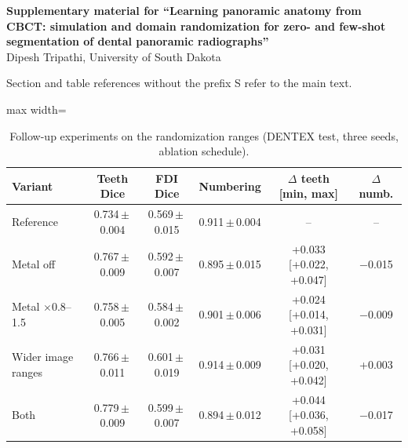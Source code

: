 \documentclass[12pt]{article}
\newcommand{\pmsd}[2]{#1\,$\pm$\,#2}
\begin{document}
\begin{center}
{\large\bfseries Supplementary material for ``Learning panoramic anatomy from CBCT: simulation and domain randomization
for zero- and few-shot segmentation of dental panoramic radiographs''}\\[6pt]
Dipesh Tripathi, University of South Dakota
\end{center}

Section and table references without the prefix S refer to the main text.

\begin{table}[h]
\centering\small
\caption{Follow-up experiments on the randomization ranges (DENTEX test, three seeds, ablation schedule).}
\label{tab:follow}
\begin{adjustbox}{max width=\linewidth}
\begin{tabular}{@{}lccccc@{}}
\toprule
Variant & Teeth Dice & FDI Dice & Numbering & $\Delta$ teeth [min, max] & $\Delta$ numb. \\
\midrule
Reference & \pmsd{0.734}{0.004} & \pmsd{0.569}{0.015} & \pmsd{0.911}{0.004} & -- & -- \\
Metal off & \pmsd{0.767}{0.009} & \pmsd{0.592}{0.007} & \pmsd{0.895}{0.015} & +0.033 [+0.022, +0.047] & $-$0.015 \\
Metal $\times$0.8--1.5 & \pmsd{0.758}{0.005} & \pmsd{0.584}{0.002} & \pmsd{0.901}{0.006} & +0.024 [+0.014, +0.031] & $-$0.009 \\
Wider image ranges & \pmsd{0.766}{0.011} & \pmsd{0.601}{0.019} & \pmsd{0.914}{0.009} & +0.031 [+0.020, +0.042] & +0.003 \\
Both & \pmsd{0.779}{0.009} & \pmsd{0.599}{0.007} & \pmsd{0.894}{0.012} & +0.044 [+0.036, +0.058] & $-$0.017 \\
\bottomrule
\end{tabular}
\end{adjustbox}
\end{table}
\end{document}
